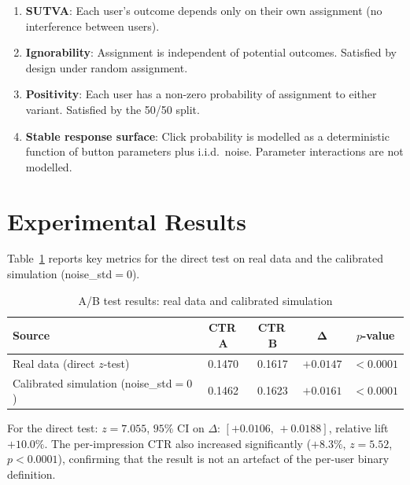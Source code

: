 \documentclass[a4paper,12pt]{extarticle}
\numberwithin{equation}{section}
\begin{document}
\begin{enumerate}
    \item \textbf{SUTVA}: Each user's outcome depends only on their own
          assignment (no interference between users).
    \item \textbf{Ignorability}: Assignment is independent of potential
          outcomes. Satisfied by design under random assignment.
    \item \textbf{Positivity}: Each user has a non-zero probability of
          assignment to either variant. Satisfied by the 50/50 split.
    \item \textbf{Stable response surface}: Click probability is modelled
          as a deterministic function of button parameters plus i.i.d.\
          noise. Parameter interactions are not modelled.
\end{enumerate}

\clearpage

\section*{Experimental Results}

Table~\ref{tab:results} reports key metrics for the direct test on real
data and the calibrated simulation (noise\_std$=0$).

\begin{table}[ht]
\centering
\caption{A/B test results: real data and calibrated simulation}
\label{tab:results}
\begin{tabular}{lcccc}
\toprule
\textbf{Source} & \textbf{CTR\,A} & \textbf{CTR\,B}
    & $\boldsymbol{\Delta}$ & \textbf{$p$-value} \\
\midrule
Real data (direct $z$-test)              & 0.1470 & 0.1617 & $+0.0147$ & $<0.0001$ \\
Calibrated simulation (noise\_std$=0$)   & 0.1462 & 0.1623 & $+0.0161$ & $<0.0001$ \\
\bottomrule
\end{tabular}
\end{table}

For the direct test: $z = 7.055$, $95\%$ CI on $\Delta$: $[+0.0106,\,
+0.0188]$, relative lift $+10.0\%$. The per-impression CTR also increased
significantly ($+8.3\%$, $z = 5.52$, $p < 0.0001$), confirming that the
result is not an artefact of the per-user binary definition.
\end{document}
